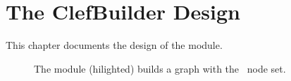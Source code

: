 
\chapter{The ClefBuilder Design}\label{chap:build}

This chapter documents the design of the  module.

\begin{figure}
  \centering
\caption{\label{fig:scaleBuild} The  module
(hilighted) builds a graph with the \clef\ node set.}
\end{figure}


